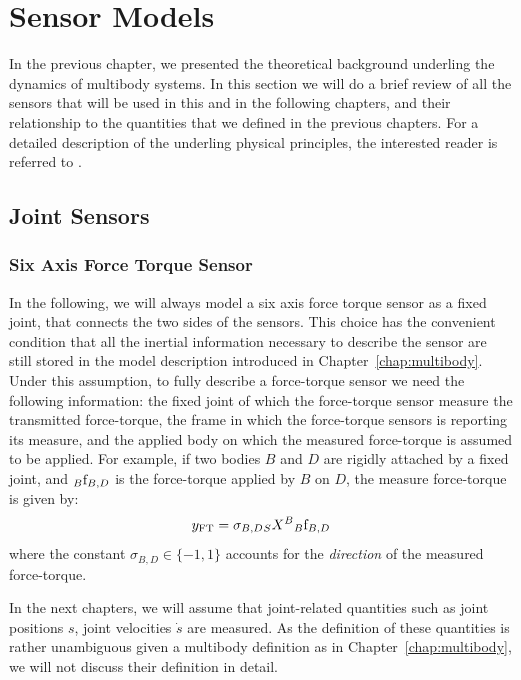 \section{Sensor Models}
\label{sec:sensorModels}
In the previous chapter, we presented the theoretical background underling the dynamics of multibody systems.
In this section we will do a brief review of all the sensors that will be used in this and in the following chapters, and their relationship to the quantities that we defined in the previous chapters. For a detailed description of the underling physical principles, the interested reader is referred to \citep[Chapter 4]{doebelin2003}. 

\subsection{Joint Sensors}
\subsubsection{Six Axis Force Torque Sensor}
In the following, we will always model a six axis force torque sensor as a fixed joint,
that connects the two sides of the sensors.  This choice has the convenient condition that all the inertial information necessary to describe the sensor are still stored in the model description introduced in Chapter~\ref{chap:multibody}. Under this assumption, to fully describe a force-torque sensor we need the following information: the fixed joint of which the force-torque sensor measure the transmitted force-torque, the frame in which the force-torque sensors is reporting its measure, and the applied body on which the measured force-torque is assumed to be applied. For example, if two bodies $B$ and $D$ are rigidly attached by a fixed joint, and $\hspace{0em}_B {\rm f}_{B,D}$ is the force-torque applied by $B$ on $D$, the measure force-torque is given by:
\begin{equation}
\label{eq:six-axis-ft-sensor}
y_{\text{FT}} = \sigma_{B,D} \hspace{0em}_S X^B \hspace{0em}_B {\rm f}_{B,D}
\end{equation}
where the constant $\sigma_{B,D} \in \{-1,1\}$ accounts for the \emph{direction} of the measured force-torque. 
\begin{remark}
In the next chapters, we will assume that joint-related quantities such as joint positions $s$, joint velocities $\dot{s}$ are measured. As the definition of these quantities is rather unambiguous given a multibody definition as in Chapter~\ref{chap:multibody}, we will not discuss their definition in detail. 
\end{remark}

